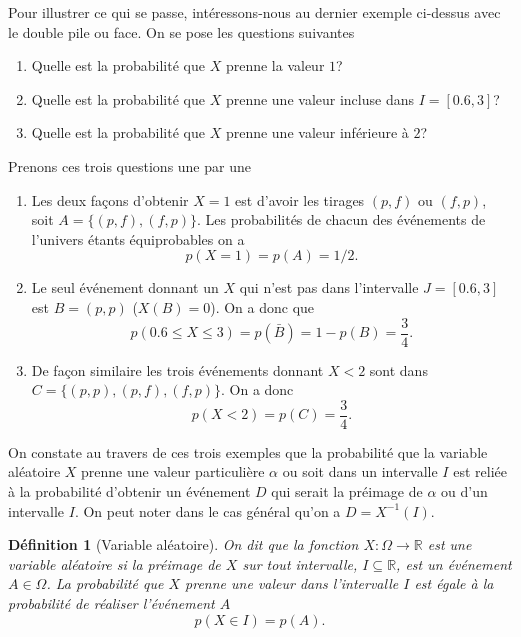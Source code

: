 \documentclass[a4paper,12pt]{book}
\newcommand{\real}{\mathbb{R}}
\newtheorem{definition}{Définition}
\begin{document}
Pour illustrer ce qui se passe, intéressons-nous au dernier exemple ci-dessus avec le double pile ou face. On se pose les questions suivantes
\begin{enumerate}
 \item Quelle est la probabilité que $X$ prenne la valeur $1$?
 \item Quelle est la probabilité que $X$ prenne une valeur incluse dans $I=[0.6,3]$?
 \item Quelle est la probabilité que $X$ prenne une valeur inférieure à $2$?
\end{enumerate}

Prenons ces trois questions une par une
\begin{enumerate}
 \item Les deux façons d'obtenir $X=1$ est d'avoir les tirages $(p,f)$ ou $(f,p)$, soit $A=\{(p,f), (f,p)\}$. Les probabilités de chacun 
 des événements de l'univers étants équiprobables on a 
 \begin{equation}
  p(X=1)=p(A)=1/2.
 \end{equation}
 \item Le seul événement donnant un $X$ qui n'est pas dans l'intervalle $J=[0.6,3]$ est $B=(p,p)$ ($X(B)=0$). On a donc que 
 \begin{equation}
p(0.6\leq X\leq 3)=p(\bar B)=1-p(B)=\frac{3}{4}.
 \end{equation}
 \item De façon similaire les trois événements donnant $X<2$ sont dans $C=\{(p,p), (p,f), (f,p)\}$. On a donc
 \begin{equation}
  p(X<2)=p(C)=\frac{3}{4}.
 \end{equation}

\end{enumerate}
On constate au travers de ces trois exemples que la probabilité que la variable 
aléatoire $X$ prenne une valeur particulière $\alpha$ ou soit dans un intervalle $I$ 
est reliée à la probabilité d'obtenir un événement $D$ qui serait la préimage de $\alpha$ ou d'un intervalle $I$.
On peut noter dans le cas général qu'on a $D=X^{-1}(I)$.

\begin{definition}[Variable aléatoire] On dit que la fonction $X:\Omega\rightarrow\real$ est une \textit{variable aléatoire} si la 
préimage de $X$ sur tout intervalle, $I\subseteq\real$, est un événement $A\in \Omega$. La probabilité que $X$ prenne une valeur 
dans l'intervalle $I$ est égale à la probabilité de réaliser l'événement $A$
\begin{equation}
 p(X\in I)=p(A).
\end{equation}
\end{definition}
\end{document}
